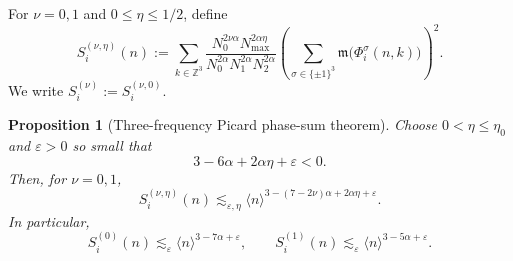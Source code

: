 \documentclass[10pt]{amsart}
\numberwithin{equation}{section}
\theoremstyle{plain}
\newtheorem{proposition}[theorem]{Proposition}
\theoremstyle{definition}
\theoremstyle{remark}
\newcommand{\Z}{\mathbb{Z}}
\newcommand{\eps}{\varepsilon}
\newcommand{\la}{\langle}
\newcommand{\ra}{\rangle}
\newcommand{\frakm}{\mathfrak{m}}
\begin{document}
For \(\nu=0,1\) and \(0\le\eta\le1/2\), define
\begin{equation}\label{B:phase-sum-def}
        S_i^{(\nu,\eta)}(n)
        :=
        \sum_{k\in\Z^3}
        \frac{N_0^{2\nu\alpha}N_{\max}^{2\alpha\eta}}
             {N_0^{2\alpha}N_1^{2\alpha}N_2^{2\alpha}}
        \left(
        \sum_{\sigma\in\{\pm1\}^3}\frakm\bigl(\Phi_i^\sigma(n,k)\bigr)
        \right)^2.
\end{equation}
We write \(S_i^{(\nu)}:=S_i^{(\nu,0)}\).

\begin{proposition}[Three-frequency Picard phase-sum theorem]\label{prop:B-phase-sum}
Choose \(0<\eta\le\eta_0\) and \(\eps>0\) so small that
\begin{equation}\label{B:eta-condition}
        3-6\alpha+2\alpha\eta+\eps<0.
\end{equation}
Then, for \(\nu=0,1\),
\begin{equation}\label{B:phase-sum-main}
        S_i^{(\nu,\eta)}(n)
        \lesssim_{\eps,\eta}
        \la n\ra^{3-(7-2\nu)\alpha+2\alpha\eta+\eps}.
\end{equation}
In particular,
\begin{equation}\label{B:phase-sum-static}
        S_i^{(0)}(n)\lesssim_\eps\la n\ra^{3-7\alpha+\eps},
        \qquad
        S_i^{(1)}(n)\lesssim_\eps\la n\ra^{3-5\alpha+\eps}.
\end{equation}
\end{proposition}
\end{document}
